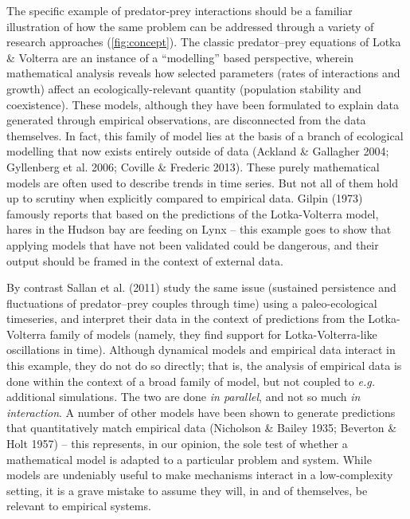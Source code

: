 \documentclass[12pt]{article}
\begin{document}
The specific example of predator-prey interactions should be a familiar
illustration of how the same problem can be addressed through a variety
of research approaches (\cref{fig:concept}). The classic
predator--prey equations of Lotka \& Volterra are an instance of a
\enquote{modelling} based perspective, wherein mathematical analysis
reveals how selected parameters (rates of interactions and growth)
affect an ecologically-relevant quantity (population stability and
coexistence). These models, although they have been formulated to
explain data generated through empirical observations, are disconnected
from the data themselves. In fact, this family of model lies at the
basis of a branch of ecological modelling that now exists entirely
outside of data (Ackland \& Gallagher 2004; Gyllenberg et al. 2006;
Coville \& Frederic 2013). These purely mathematical models are often
used to describe trends in time series. But not all of them hold up to
scrutiny when explicitly compared to empirical data. Gilpin (1973)
famously reports that based on the predictions of the Lotka-Volterra
model, hares in the Hudson bay are feeding on Lynx -- this example goes
to show that applying models that have not been validated could be
dangerous, and their output should be framed in the context of external
data.

By contrast Sallan et al. (2011) study the same issue (sustained
persistence and fluctuations of predator--prey couples through time)
using a paleo-ecological timeseries, and interpret their data in the
context of predictions from the Lotka-Volterra family of models (namely,
they find support for Lotka-Volterra-like oscillations in time).
Although dynamical models and empirical data interact in this example,
they do not do so directly; that is, the analysis of empirical data is
done within the context of a broad family of model, but not coupled to
\emph{e.g.} additional simulations. The two are done \emph{in parallel},
and not so much \emph{in interaction}. A number of other models have
been shown to generate predictions that quantitatively match empirical
data (Nicholson \& Bailey 1935; Beverton \& Holt 1957) -- this
represents, in our opinion, the sole test of whether a mathematical
model is adapted to a particular problem and system. While models are
undeniably useful to make mechanisms interact in a low-complexity
setting, it is a grave mistake to assume they will, in and of
themselves, be relevant to empirical systems.
\end{document}
